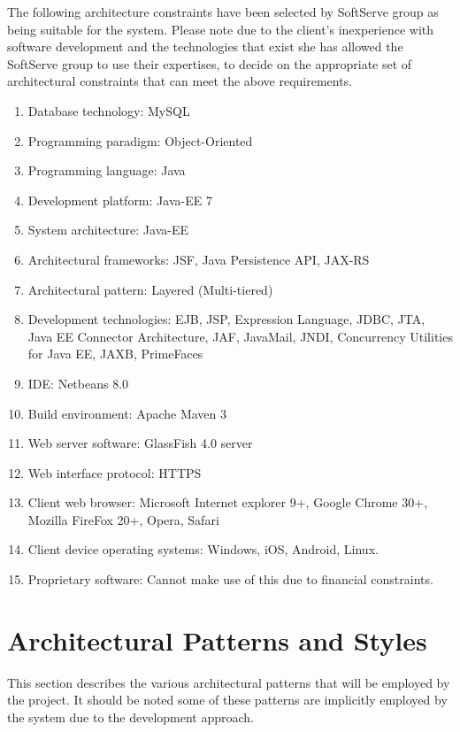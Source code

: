 \documentclass[12pt]{article}
\begin{document}
The following architecture constraints have been selected by SoftServe group as being suitable for the system. Please note due to the client's inexperience with software development and the technologies that exist she has allowed the SoftServe group to use their expertises, to decide on the appropriate set of architectural constraints that can meet the above requirements.
\begin{enumerate}
\item Database technology: MySQL
\item Programming paradigm: Object-Oriented
\item Programming language: Java
\item Development platform: Java-EE 7 
\item System architecture: Java-EE
\item Architectural frameworks: JSF, Java Persistence API, JAX-RS
\item Architectural pattern: Layered (Multi-tiered)
\item Development technologies: EJB, JSP, Expression Language, JDBC, JTA, Java EE Connector Architecture, JAF, JavaMail, JNDI, Concurrency Utilities for Java EE, JAXB, PrimeFaces
\item IDE: Netbeans 8.0
\item Build environment: Apache Maven 3
\item Web server software: GlassFish 4.0 server
\item Web interface protocol: HTTPS
\item Client web browser: Microsoft Internet explorer 9+, Google Chrome 30+, Mozilla FireFox 20+, Opera, Safari
\item Client device operating systems: Windows, iOS, Android, Linux.
\item Proprietary software: Cannot make use of this due to financial constraints. 
\end{enumerate}
\vspace{0.5in}


\section{Architectural Patterns and Styles} %
This section describes the various architectural patterns that will be employed by the project. It should be noted some of these patterns are implicitly employed by the system due to the development approach.  
\end{document}
